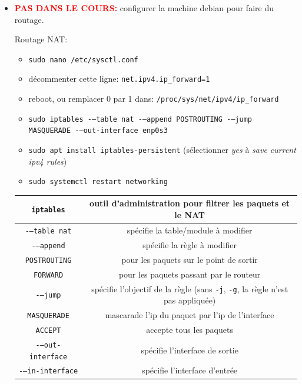 \documentclass[a4paper]{article}
\begin{document}
\begin{itemize}
\item \textcolor{red}{\textbf{PAS DANS LE COURS:}} configurer la machine debian pour faire du routage.
\begin{example}
    Routage NAT:
    \begin{itemize}
        \item \texttt{sudo nano /etc/sysctl.conf}
        \item décommenter cette ligne: \texttt{net.ipv4.ip\_forward=1}
        \item reboot, ou remplacer 0 par 1 dans: \texttt{/proc/sys/net/ipv4/ip\_forward}
        \item \texttt{sudo iptables -{}–table nat -{}–append POSTROUTING -{}–jump MASQUERADE -{}–out-interface enp0s3}
        \item \texttt{sudo apt install iptables-persistent} (sélectionner \textit{yes} à \textit{save current ipv4 rules})
        \item \texttt{sudo systemctl restart networking}
    \end{itemize}
    \begin{center}
        \begin{tabular}{|c|c|} \hline
            \texttt{iptables} & outil d'administration pour filtrer les paquets et le NAT \\ \hline
            \texttt{-{}–table nat} & spécifie la table/module à modifier \\ \hline
            \texttt{-{}–append} & spécifie la règle à modifier \\ \hline
            \texttt{POSTROUTING} & pour les paquets sur le point de sortir \\ \hline
            \texttt{FORWARD} & pour les paquets passant par le routeur \\ \hline
            \texttt{-{}–jump} & spécifie l'objectif de la règle (sans \texttt{-j}, \texttt{-g}, la règle n'est pas appliquée) \\ \hline
            \texttt{MASQUERADE} & mascarade l'ip du paquet par l'ip de l'interface \\ \hline
            \texttt{ACCEPT} & accepte tous les paquets \\ \hline
            \texttt{-{}–out-interface} & spécifie l'interface de sortie \\ \hline
            \texttt{-{}–in-interface} & spécifie l'interface d'entrée \\ \hline
        \end{tabular}
    \end{center}
\end{example}

\end{itemize}
\end{document}
